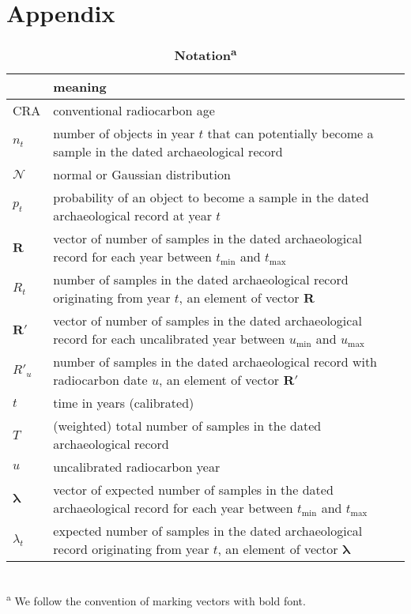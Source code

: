 \documentclass[a4paper]{article}
\begin{document}
\printbibliography[notcategory=ignore]



\newpage
\section*{\centering Appendix}

\begin{table}[h]
\caption{\textbf{Notation\textsuperscript{a}}}
\label{tab:notation}
\small
\begin{tabularx}{\textwidth}{lX}
\hline
& meaning \\
\hline\hline
CRA & conventional radiocarbon age\\
$n_t$ & number of objects in year $t$ that can potentially become a sample in the dated archaeological record\\
$\mathcal{N}$ & normal or Gaussian distribution\\
$p_t$ & probability of an object to become a sample in the dated archaeological record at year $t$\\
$\bm{R}$ & vector of number of samples in the dated archaeological record for each year between $t_\mathrm{min}$ and $t_\mathrm{max}$\\
$R_t$ & number of samples in the dated archaeological record originating from year $t$, an element of vector $\bm{R}$\\
$\bm{R'}$ & vector of number of samples in the dated archaeological record for each uncalibrated year between $u_\mathrm{min}$ and $u_\mathrm{max}$\\
$R'_u$ & number of samples in the dated archaeological record with radiocarbon date $u$, an element of vector $\bm{R'}$\\
$t$ & time in years (calibrated)\\
$T$ & (weighted) total number of samples in the dated archaeological record\\
$u$ & uncalibrated radiocarbon year\\
$\bm{\lambda}$ & vector of expected number of samples in the dated archaeological record for each year between $t_\mathrm{min}$ and $t_\mathrm{max}$\\
$\lambda_t$ & expected number of samples in the dated archaeological record originating from year $t$, an element of vector $\bm{\lambda}$\\
\hline
\end{tabularx}\\
\footnotesize{\textsuperscript{a} We follow the convention of marking vectors with bold font.}\\\end{table}
\end{document}
